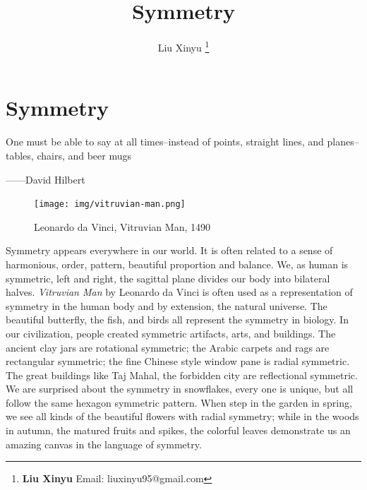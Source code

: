 \documentclass[b5paper]{article}
\begin{document}
\title{Symmetry}

\author{Liu Xinyu
\thanks{{\bfseries Liu Xinyu} \newline
  Email: liuxinyu95@gmail.com \newline}}

\maketitle
\fi


\ifx\wholebook\relax
\chapter{Symmetry}
\fi

\epigraph{One must be able to say at all times--instead of points, straight lines, and planes--tables, chairs, and beer mugs}{——David Hilbert}

\begin{figure}
 \centering
 \texttt{[image: img/vitruvian-man.png]}
 \captionsetup{labelformat=empty}
 \caption{Leonardo da Vinci, Vitruvian Man, 1490}
\end{figure}

Symmetry appears everywhere in our world. It is often related to a sense of harmonious, order, pattern, beautiful proportion and balance. We, as human is symmetric, left and right, the sagittal plane divides our body into bilateral halves. {\em Vitruvian Man} by Leonardo da Vinci is often used as a representation of symmetry in the human body and by extension, the natural universe. The beautiful butterfly, the fish, and birds all represent the symmetry in biology. In our civilization, people created symmetric artifacts, arts, and buildings. The ancient clay jars are rotational symmetric; the Arabic carpets and rags are rectangular symmetric; the fine Chinese style window pane is radial symmetric. The great buildings like Taj Mahal, the forbidden city are reflectional symmetric. We are surprised about the symmetry in snowflakes, every one is unique, but all follow the same hexagon symmetric pattern. When step in the garden in spring, we see all kinds of the beautiful flowers with radial symmetry; while in the woods in autumn, the matured fruits and spikes, the colorful leaves demonstrate us an amazing canvas in the language of symmetry.
\end{document}
